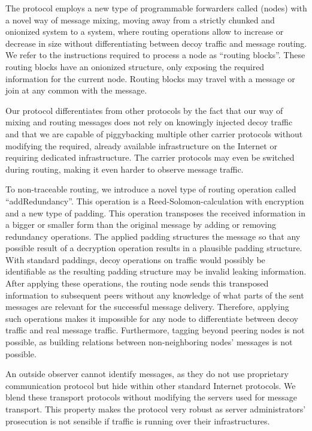 The protocol employs a new type of programmable forwarders called \VortexNodes{} (nodes) with a novel way of message mixing, moving away from a strictly chunked and onionized system to a system, where routing operations allow to increase or decrease in size without differentiating between decoy traffic and message routing. We refer to the instructions required to process a node as ``routing blocks''. These routing blocks have an onionized structure, only exposing the required information for the current node. Routing blocks may travel with a message or join at any common \VortexNode with the message.

Our protocol differentiates from other protocols by the fact that our way of mixing and routing messages does not rely on knowingly injected decoy traffic and that we are capable of piggybacking multiple other carrier protocols without modifying the required, already available infrastructure on the Internet or requiring dedicated infrastructure. The carrier protocols may even be switched during routing, making it even harder to observe message traffic. 

To non-traceable routing, we introduce a novel type of routing operation called ``addRedundancy''. This operation is a Reed-Solomon-calculation with encryption and a new type of padding. This operation transposes the received information in a bigger or smaller form than the original message by adding or removing redundancy operations. The applied padding structures the message so that any possible result of a decryption operation results in a plausible padding structure. With standard paddings, decoy operations on traffic would possibly be identifiable as the resulting padding structure may be invalid leaking information. After applying these operations, the routing node sends this transposed information to subsequent peers without any knowledge of what parts of the sent messages are relevant for the successful message delivery. Therefore, applying such operations makes it impossible for any node to differentiate between decoy traffic and real message traffic. Furthermore, tagging beyond peering nodes is not possible, as building relations between non-neighboring nodes' messages is not possible.

An outside observer cannot identify messages, as they do not use proprietary communication protocol but hide within other standard Internet protocols. We blend these transport protocols without modifying the servers used for message transport. This property makes the protocol very robust as server administrators' prosecution is not sensible if traffic is running over their infrastructures. 


